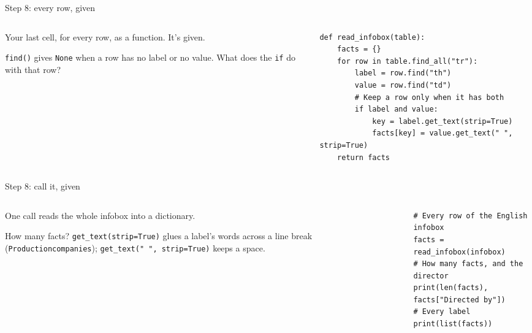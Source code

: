 \documentclass[9pt,aspectratio=169]{beamer}
\begin{document}
\begin{frame}[fragile]{Step 8: every row, given}
    \begin{columns}[T]
        \begin{column}{0.37\textwidth}
            Your last cell, for every row, as a function. It's given.

            \medskip
            \texttt{find()} gives \texttt{None} when a row has no label or no value. What does the \texttt{if} do with that row?
        \end{column}
        \begin{column}{0.6\textwidth}
\begin{lstlisting}
def read_infobox(table):
    facts = {}
    for row in table.find_all("tr"):
        label = row.find("th")
        value = row.find("td")
        # Keep a row only when it has both
        if label and value:
            key = label.get_text(strip=True)
            facts[key] = value.get_text(" ", strip=True)
    return facts
\end{lstlisting}
        \end{column}
    \end{columns}
\end{frame}

\begin{frame}[fragile]{Step 8: call it, given}
    \begin{columns}[T]
        \begin{column}{0.37\textwidth}
            One call reads the whole infobox into a dictionary.

            \medskip
            How many facts? \texttt{get\_text(strip=True)} glues a label's words across a line break (\texttt{Productioncompanies}); \texttt{get\_text(" ", strip=True)} keeps a space.
        \end{column}
        \begin{column}{0.6\textwidth}
\begin{lstlisting}
# Every row of the English infobox
facts = read_infobox(infobox)
# How many facts, and the director
print(len(facts), facts["Directed by"])
# Every label
print(list(facts))
\end{lstlisting}
        \end{column}
    \end{columns}
\end{frame}
\end{document}
